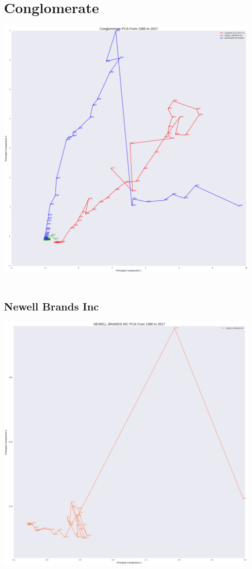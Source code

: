 \section{Conglomerate}
\includegraphics[width=1\textwidth]{./Conglomerates}\\[0.1in] \\
\subsection{Newell Brands Inc}
\includegraphics[width=1\textwidth]{./Newell}\\[0.1in] \\
